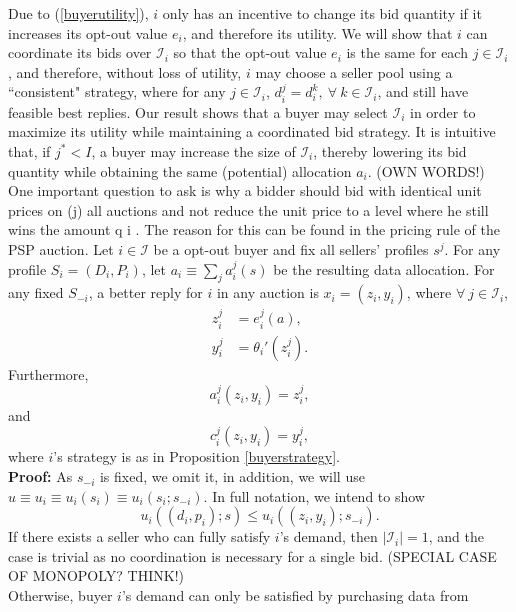 \documentclass[12pt]{article}
\theoremstyle{definition}
\newcommand{\mcI}{\mathcal{I}}
\begin{document}
\begin{multicols}{2}
Due to (\ref{buyerutility}), $i$ only has an incentive to change its bid
quantity if it increases its opt-out value $e_i$, and therefore its utility. 
We will show that $i$ can coordinate its
bids over $\mcI_i$ so that the opt-out value $e_i$ is the same for each
$j \in\mcI_i$, and therefore, without loss of utility, $i$ may choose a seller pool 
using a ``consistent" strategy, where for any $j\in \mcI_i$, $d_i^j = d_i^k, \
\forall \ k \in \mcI_i$, and still have feasible best replies. 
Our result shows that a buyer may select $\mcI_i$ in order to maximize its
utility while maintaining a coordinated bid strategy. 
It is intuitive that, if $j^*
< I$, a buyer may increase the size of $\mcI_i$, thereby lowering its bid
quantity while obtaining the same (potential) allocation $a_i$. 
(OWN WORDS!)
One important question to ask is why a bidder should bid with identical unit
prices on (j) all auctions and not reduce the unit price to a level where he still wins the
amount q i . The reason for this can be found in the pricing rule of the PSP auction. 
{
\label{coordinationlemma} 
Let $i\in\mcI$ be a opt-out buyer and fix all sellers' profiles $s^j$.
For any profile $S_i = (D_i, P_i)$, let $a_i \equiv \sum_j a_i^j(s)$ be the resulting data
allocation. For any fixed $S_{-i}$, a better reply for $i$ in any auction is $x_i =
(z_i,y_i)$, where $\forall \ j \in \mcI_i$,
\begin{align*}
    z_i^j &= e_i^j(a), \\
    y_i^j &= \theta_i'(z_i^j).
\end{align*}
Furthermore,
\begin{equation}\label{allocationcoordination}
    a_i^j(z_i,y_i) = z_i^{j},
\end{equation}
and
\begin{equation}\label{costcoordination}
    c_i^j(z_i,y_i) = y_i^{j},
\end{equation}
where $i$'s strategy is as in Proposition \ref{buyerstrategy}.
}\\
\textbf{Proof:}
As $s_{-i}$ is fixed, we omit it, in addition, we will use $u\equiv u_i \equiv u_i(s_i) \equiv
u_i(s_i;s_{-i})$. In full notation, we intend to show
$$
    u_i((d_i,p_i);s) \le u_i((z_i,y_i);s_{-i}).
$$
If there exists a seller who can fully satisfy $i$'s demand,
then $\vert\mcI_i\vert = 1$, and the case is trivial as no
coordination is necessary for a single bid. (SPECIAL CASE OF MONOPOLY? THINK!)\\
Otherwise, buyer $i$'s demand can only be satisfied by purchasing data from

\end{multicols}
\end{document}
